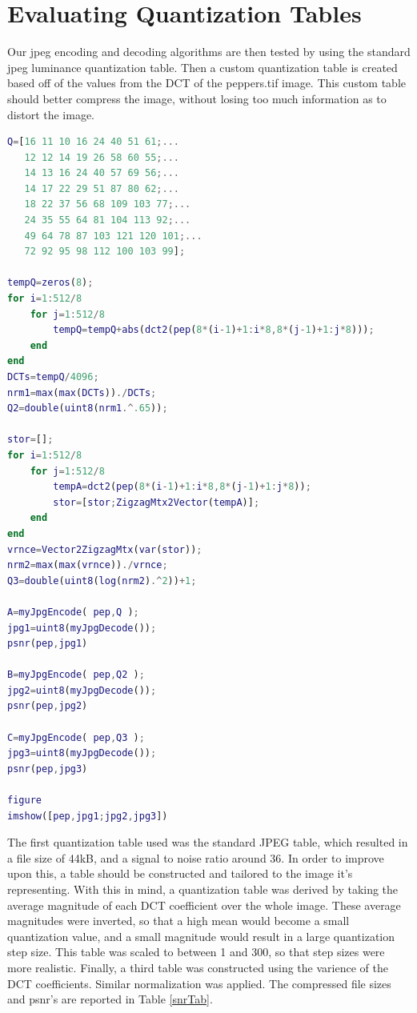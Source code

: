 \documentclass{article}
\begin{document}
\newpage
\section{Evaluating Quantization Tables}
\qquad Our jpeg encoding and decoding algorithms are then tested by using
the standard jpeg luminance quantization table. Then a custom quantization
table is created based off of the values from the DCT of the peppers.tif
image. This custom table should better compress the image, without losing
too much information as to distort the image.  

\begin{lstlisting}[language=Matlab]
Q=[16 11 10 16 24 40 51 61;...
   12 12 14 19 26 58 60 55;...
   14 13 16 24 40 57 69 56;...
   14 17 22 29 51 87 80 62;...
   18 22 37 56 68 109 103 77;...
   24 35 55 64 81 104 113 92;...
   49 64 78 87 103 121 120 101;...
   72 92 95 98 112 100 103 99];

tempQ=zeros(8);
for i=1:512/8
    for j=1:512/8
        tempQ=tempQ+abs(dct2(pep(8*(i-1)+1:i*8,8*(j-1)+1:j*8)));
    end
end
DCTs=tempQ/4096;
nrm1=max(max(DCTs))./DCTs;
Q2=double(uint8(nrm1.^.65));

stor=[];
for i=1:512/8
    for j=1:512/8
        tempA=dct2(pep(8*(i-1)+1:i*8,8*(j-1)+1:j*8));
        stor=[stor;ZigzagMtx2Vector(tempA)];
    end
end
vrnce=Vector2ZigzagMtx(var(stor));
nrm2=max(max(vrnce))./vrnce;
Q3=double(uint8(log(nrm2).^2))+1;

A=myJpgEncode( pep,Q );
jpg1=uint8(myJpgDecode());
psnr(pep,jpg1)

B=myJpgEncode( pep,Q2 );
jpg2=uint8(myJpgDecode());
psnr(pep,jpg2)

C=myJpgEncode( pep,Q3 );
jpg3=uint8(myJpgDecode());
psnr(pep,jpg3)

figure
imshow([pep,jpg1;jpg2,jpg3])
\end{lstlisting}

The first quantization table used was the standard JPEG table, which resulted
in a file size of 44kB, and a signal to noise ratio around 36. In order to
improve upon this, a table should be constructed and tailored to the image it's
representing. With this in mind, a quantization table was derived by taking the
average magnitude of each DCT coefficient over the whole image. These average
magnitudes were inverted, so that a high mean would become a small quantization
value, and a small magnitude would result in a large quantization step size.
This table was scaled to between 1 and 300, so that step sizes were more realistic.
Finally, a third table was constructed using the varience of the DCT coefficients.
Similar normalization was applied. The compressed file sizes and psnr's are reported
in Table \ref{snrTab}.
\end{document}
